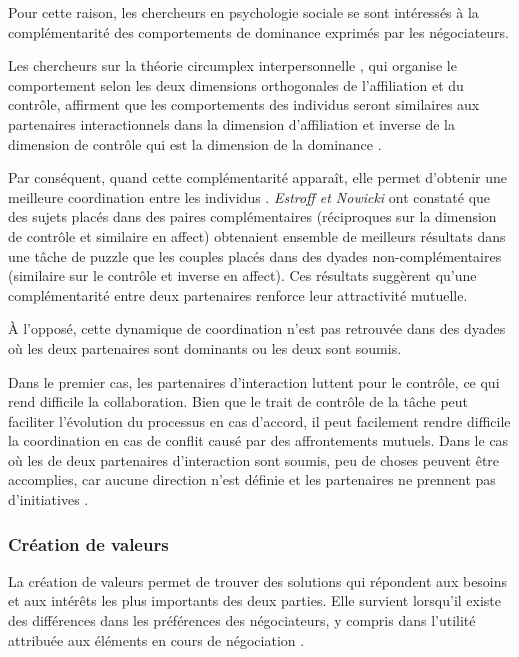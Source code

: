 		Pour cette raison, les chercheurs en psychologie sociale se sont intéressés à la complémentarité des comportements de dominance exprimés par les négociateurs. 
		
		Les chercheurs sur la théorie circumplex interpersonnelle \cite{wiggins1979psychological, kiesler19831982}, qui organise le comportement selon les deux dimensions orthogonales de l'affiliation et du contrôle, affirment que les comportements des individus seront similaires aux partenaires interactionnels dans la dimension d'affiliation et inverse de la dimension de contrôle qui est la dimension de la dominance \cite{tiedens2003power}.
		
		Par conséquent, quand cette complémentarité apparaît, elle permet d'obtenir une meilleure coordination entre les individus \cite{wiltermuth2015benefits}. \emph{Estroff et Nowicki} \cite{estroff1992interpersonal} ont constaté que des sujets placés dans des paires complémentaires (réciproques sur la dimension de contrôle et similaire en affect) obtenaient ensemble de meilleurs résultats dans une tâche de puzzle que les couples placés dans des dyades non-complémentaires (similaire sur le contrôle et inverse en affect). Ces résultats suggèrent qu'une complémentarité entre deux partenaires renforce leur attractivité mutuelle.
		
		À l'opposé, cette dynamique de coordination n'est pas retrouvée dans des dyades où les deux partenaires sont dominants ou les deux sont soumis. 
		
		Dans le premier cas, les partenaires d'interaction luttent pour le contrôle, ce qui rend difficile la collaboration. Bien que le trait de contrôle de la tâche peut faciliter l'évolution du processus en cas d'accord, il peut facilement rendre difficile la coordination en cas de conflit causé par des affrontements mutuels. Dans le cas où les de deux partenaires d'interaction sont soumis, peu de choses peuvent être accomplies, car aucune direction n'est définie et les partenaires ne prennent pas d'initiatives \cite{wiltermuth2015benefits}.
		
		 
		
		\subsubsection*{Création de valeurs}
		
		La création de valeurs permet de trouver des solutions qui répondent aux besoins et aux intérêts les plus importants des deux parties. Elle survient lorsqu'il existe des différences dans les préférences des négociateurs, y compris dans l'utilité attribuée  aux éléments en cours de négociation \cite{lax1986managerial}. 
		
